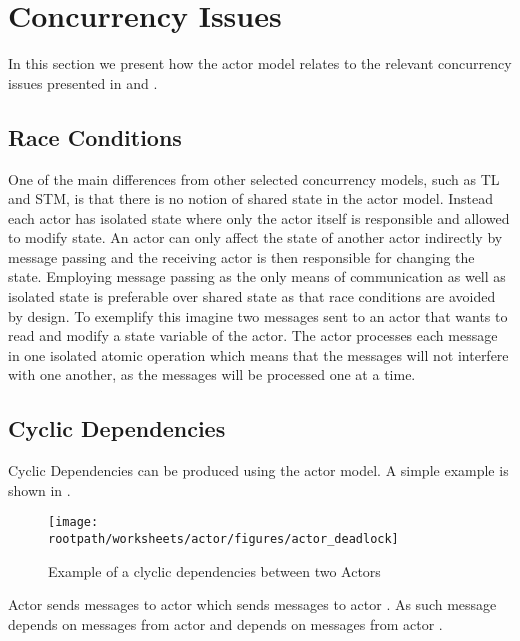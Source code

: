 \section{Concurrency Issues}\label{sec:actor_con_issues}
In this section we present how the actor model relates to the relevant concurrency issues presented in  and .

\subsection{Race Conditions}
One of the main differences from other selected concurrency models, such as \ac{TL} and \ac{STM}, is that there is no notion of shared state in the actor model. Instead each actor has isolated state where only the actor itself is responsible and allowed to modify state. An actor can only affect the state of another actor indirectly by message passing and the receiving actor is then responsible for changing the state. Employing message passing as the only means of communication as well as isolated state is preferable over shared state as that race conditions are avoided by design. To exemplify this imagine two messages sent to an actor that wants to read and modify a state variable of the actor. The actor processes each message in one isolated atomic operation which means that the messages will not interfere with one another, as the messages will be processed one at a time.

\subsection{Cyclic Dependencies}
Cyclic Dependencies can be produced using the actor model. A simple example is shown in .

\begin{figure}[ht!]
\centering
\texttt{[image: \\rootpath/worksheets/actor/figures/actor\_deadlock]}
\caption{Example of a clyclic dependencies between two Actors}\label{fig:actor_cyclic}
\end{figure}

Actor  sends messages to actor  which sends messages to actor . As such message  depends on messages from actor  and  depends on messages from actor . 

